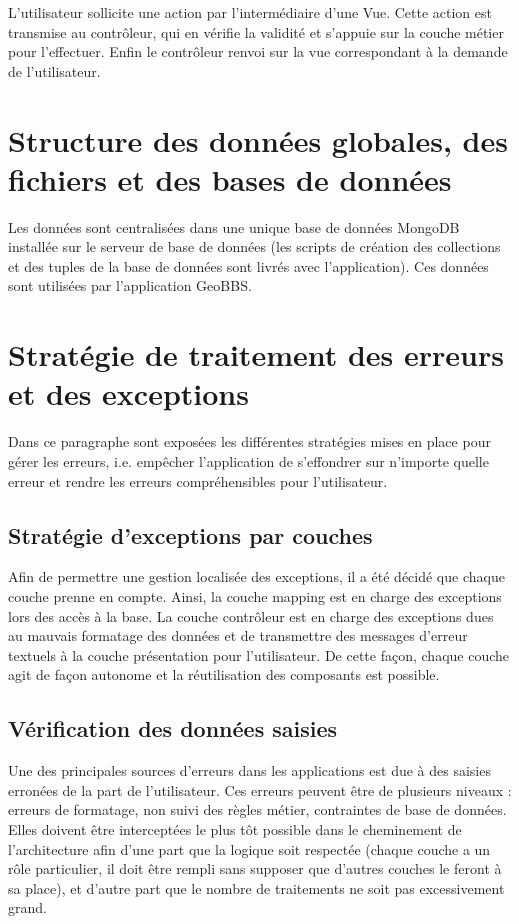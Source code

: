 \documentclass[a4paper,12pt]{report}
\begin{document}
\begin{onehalfspace}
L'utilisateur sollicite une action par l’intermédiaire d’une Vue. Cette action est transmise au contrôleur, qui en vérifie la validité et s’appuie sur la couche métier pour l’effectuer. Enfin le contrôleur renvoi sur la vue correspondant à la demande de l’utilisateur.

\chapter{Structure des données globales, des fichiers et des bases de données} %
  Les données sont centralisées dans une unique base de données MongoDB installée sur le serveur de base de données (les scripts de création des collections et des tuples de la base de données sont livrés avec l’application). Ces données sont utilisées par l’application GeoBBS.

\chapter{Stratégie de traitement des erreurs et des exceptions}
  Dans ce paragraphe sont exposées les différentes stratégies mises en place pour gérer les erreurs, i.e. empêcher l’application de s’effondrer sur n’importe quelle erreur et rendre les erreurs compréhensibles pour l’utilisateur.

\section{Stratégie d’exceptions par couches}
  Afin de permettre une gestion localisée des exceptions, il a été décidé que chaque couche prenne en compte. Ainsi, la couche mapping est en charge des exceptions lors des accès à la base. La couche contrôleur est en charge des exceptions dues au mauvais formatage des données et de transmettre des messages d’erreur textuels à la couche présentation pour l’utilisateur. De cette façon, chaque couche agit de façon autonome et la réutilisation des composants est possible.

\section{Vérification des données saisies}
  Une des principales sources d’erreurs dans les applications est due à des saisies erronées de la part de l’utilisateur. Ces erreurs peuvent être de plusieurs niveaux : erreurs de formatage, non suivi des règles métier, contraintes de base de données. Elles doivent être interceptées le plus tôt possible dans le cheminement de l’architecture afin d’une part que la logique soit respectée (chaque couche a un rôle particulier, il doit être  rempli sans supposer que d’autres couches le feront à sa place), et d’autre part que le nombre de traitements ne soit pas excessivement grand.


\end{onehalfspace}
\end{document}
